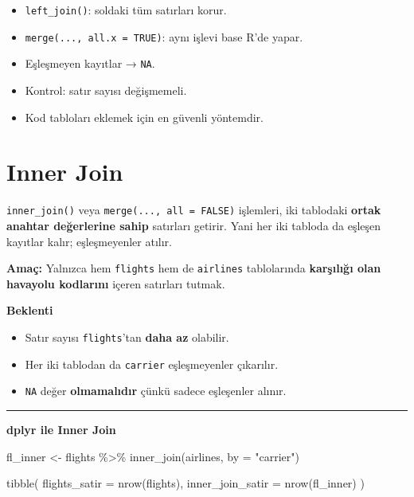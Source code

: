 \documentclass[
  letterpaper,
  DIV=11,
  numbers=noendperiod]{scrreprt}
\newenvironment{Shaded}{\begin{snugshade}}{\end{snugshade}}
\newcommand{\AttributeTok}[1]{\textcolor[rgb]{0.40,0.45,0.13}{#1}}
\newcommand{\FunctionTok}[1]{\textcolor[rgb]{0.28,0.35,0.67}{#1}}
\newcommand{\NormalTok}[1]{\textcolor[rgb]{0.00,0.23,0.31}{#1}}
\newcommand{\OtherTok}[1]{\textcolor[rgb]{0.00,0.23,0.31}{#1}}
\newcommand{\SpecialCharTok}[1]{\textcolor[rgb]{0.37,0.37,0.37}{#1}}
\newcommand{\StringTok}[1]{\textcolor[rgb]{0.13,0.47,0.30}{#1}}
\providecommand{\tightlist}{%
  \setlength{\itemsep}{0pt}\setlength{\parskip}{0pt}}
\begin{document}

\begin{itemize}
\item
  \texttt{left\_join()}: soldaki tüm satırları korur.
\item
  \texttt{merge(...,\ all.x\ =\ TRUE)}: aynı işlevi base R'de yapar.
\item
  Eşleşmeyen kayıtlar → \texttt{NA}.
\item
  Kontrol: satır sayısı değişmemeli.
\item
  Kod tabloları eklemek için en güvenli yöntemdir.
\end{itemize}

\section*{Inner Join}\label{inner-join}


\texttt{inner\_join()} veya \texttt{merge(...,\ all\ =\ FALSE)}
işlemleri, iki tablodaki \textbf{ortak anahtar değerlerine sahip}
satırları getirir. Yani her iki tabloda da eşleşen kayıtlar kalır;
eşleşmeyenler atılır.

\textbf{Amaç:} Yalnızca hem \texttt{flights} hem de \texttt{airlines}
tablolarında \textbf{karşılığı olan havayolu kodlarını} içeren satırları
tutmak.

\textbf{Beklenti}

\begin{itemize}
\tightlist
\item
  Satır sayısı \texttt{flights}'tan \textbf{daha az} olabilir.
\item
  Her iki tablodan da \texttt{carrier} eşleşmeyenler çıkarılır.
\item
  \texttt{NA} değer \textbf{olmamalıdır} çünkü sadece eşleşenler alınır.
\end{itemize}

\begin{center}\rule{0.5\linewidth}{0.5pt}\end{center}

\textbf{dplyr ile Inner Join}

\begin{Shaded}
\begin{Highlighting}[]
\NormalTok{fl\_inner }\OtherTok{\textless{}{-}}\NormalTok{ flights }\SpecialCharTok{\%\textgreater{}\%}
  \FunctionTok{inner\_join}\NormalTok{(airlines, }\AttributeTok{by =} \StringTok{"carrier"}\NormalTok{)}

\FunctionTok{tibble}\NormalTok{(}
  \AttributeTok{flights\_satir =} \FunctionTok{nrow}\NormalTok{(flights),}
  \AttributeTok{inner\_join\_satir =} \FunctionTok{nrow}\NormalTok{(fl\_inner)}
\NormalTok{)}
\end{Highlighting}
\end{Shaded}
\end{document}
